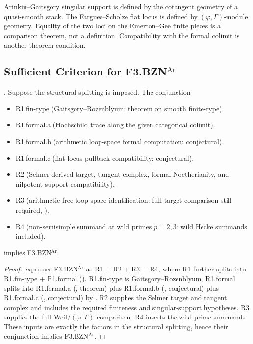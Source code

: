 \begin{remark}
\label{v4-arith:bzn-sub:rem:R1-formal-c-precise}
Arinkin--Gaitsgory singular support is defined by the cotangent
geometry of a quasi-smooth stack.  The Fargues--Scholze flat locus is
defined by \((\varphi,\Gamma)\)-module geometry.  Equality of the two
loci on the Emerton--Gee finite pieces is a comparison theorem, not a
definition.  Compatibility with the formal colimit is another theorem
condition.
\end{remark}

\subsection{Sufficient Criterion for F3.BZN\texorpdfstring{\(^{\mathrm{Ar}}\)}{Ar}}

\begin{theorem}
\label{v4-arith:bzn-sub:thm:R1-formal-bc-reduction}
\ClaimStatusProvedHere. Suppose the structural splitting
 is imposed. The conjunction
\begin{itemize}
\item R1.fin-type (Gaitsgory--Rozenblyum: theorem on smooth
finite-type).
\item R1.formal.a (Hochschild trace along the given categorical
colimit).
\item R1.formal.b (arithmetic loop-space formal computation:
conjectural).
\item R1.formal.c (flat-locus pullback compatibility: conjectural).
\item R2 (Selmer-derived target, tangent complex, formal
Noetherianity, and nilpotent-support compatibility).
\item R3 (arithmetic free loop space identification: full-target
comparison still required,
).
\item R4 (non-semisimple summand at wild primes \(p=2,3\):
wild Hecke summands included).
\end{itemize}
implies F3.BZN\(^{\mathrm{Ar}}\).
\end{theorem}

\begin{proof}
 expresses
F3.BZN\(^{\mathrm{Ar}}\) as R1 \(+\) R2 \(+\) R3 \(+\) R4, where R1 further
splits into R1.fin-type \(+\) R1.formal
(). R1.fin-type is
Gaitsgory--Rozenblyum; R1.formal splits into R1.formal.a
(, theorem) plus
R1.formal.b (,
conjectural) plus R1.formal.c
(, conjectural) by
. R2 supplies the
Selmer target and tangent complex and includes the required finiteness
and singular-support hypotheses. R3 supplies the full
Weil/\((\varphi,\Gamma)\) comparison. R4 inserts the wild-prime
summands. These inputs are exactly the factors in the structural
splitting, hence their conjunction implies F3.BZN\(^{\mathrm{Ar}}\).
\end{proof}

